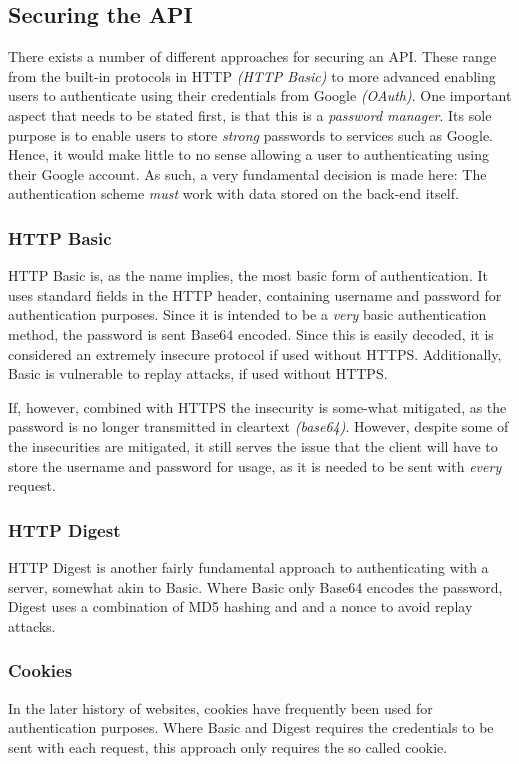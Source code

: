 		\subsection{Securing the API}
			There exists a number of different approaches for securing an API. These range from the built-in protocols in HTTP \emph{(HTTP Basic)} to more advanced enabling users to authenticate using their credentials from Google \emph{(OAuth)}. One important aspect that needs to be stated first, is that this is a \emph{password manager}. Its sole purpose is to enable users to store \emph{strong} passwords to services such as Google. Hence, it would make little to no sense allowing a user to authenticating using their Google account. As such, a very fundamental decision is made here: The authentication scheme \emph{must} work with data stored on the back-end itself.

			\subsubsection{HTTP Basic}
				HTTP Basic is, as the name implies, the most basic form of authentication. It uses standard fields in the HTTP header, containing username and password for authentication purposes. Since it is intended to be a \emph{very} basic authentication method, the password is sent Base64 encoded. Since this is easily decoded, it is considered an extremely insecure protocol if used without HTTPS. Additionally, Basic is vulnerable to replay attacks, if used without HTTPS.

				If, however, combined with HTTPS the insecurity is some-what mitigated, as the password is no longer transmitted in cleartext \emph{(base64)}. However, despite some of the insecurities are mitigated, it still serves the issue that the client will have to store the username and password for usage, as it is needed to be sent with \emph{every} request.

			\subsubsection{HTTP Digest}
				HTTP Digest is another fairly fundamental approach to authenticating with a server, somewhat akin to Basic. Where Basic only Base64 encodes the password, Digest uses a combination of MD5 hashing and and a nonce to avoid replay attacks. 

			\subsubsection{Cookies}
				In the later history of websites, cookies have frequently been used for authentication purposes. Where Basic and Digest requires the credentials to be sent with each request, this approach only requires the so called cookie.

